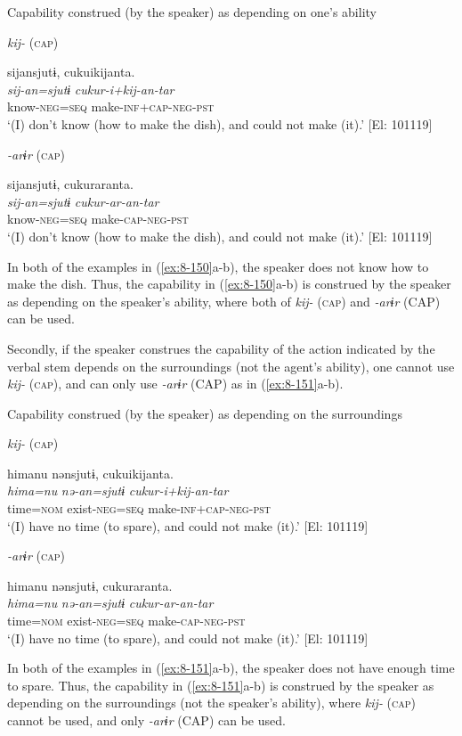\ea\label{ex:8-150}
  Capability construed (by the speaker) as depending on one’s ability

\ea \textit{kij-} (\textsc{cap})

  {\TM}
\glll  sijansjutɨ,  cukuikijanta.\\
\textit{sij-an=sjutɨ}  \textit{cukur-i+kij-an-tar}\\
    know-\textsc{neg}=\textsc{seq}  make-\textsc{inf}+\textsc{cap}-\textsc{neg}-\textsc{pst}\\
\glt ‘(I) don’t know (how to make the dish), and could not make (it).’ [El: 101119]


\ex \textit{-arɨr} (\textsc{cap})

  {\TM}
\glll  sijansjutɨ,  cukuraranta.\\
\textit{sij-an=sjutɨ}  \textit{cukur-ar-an-tar}\\
    know-\textsc{neg}=\textsc{seq}  make-\textsc{cap}-\textsc{neg}-\textsc{pst}\\
\glt ‘(I) don’t know (how to make the dish), and could not make (it).’ [El: 101119]
\z
\z

In both of the examples in (\ref{ex:8-150}a-b), the speaker does not know how to make the dish. Thus, the capability in (\ref{ex:8-150}a-b) is construed by the speaker as depending on the speaker’s ability, where both of \textit{kij-} (\textsc{cap}) and \textit{-arɨr} (CAP) can be used.

Secondly, if the speaker construes the capability of the action indicated by the verbal stem depends on the surroundings (not the agent’s ability), one cannot use \textit{kij-} (\textsc{cap}), and can only use \textit{-arɨr} (CAP) as in (\ref{ex:8-151}a-b).

\ea\label{ex:8-151}
  Capability construed (by the speaker) as depending on the surroundings

\ea \textit{kij-} (\textsc{cap})

  {\TM}
\glll  *himanu  nənsjutɨ,  cukuikijanta.\\
\textit{hima=nu}  \textit{nə-an=sjutɨ}  \textit{cukur-i+kij-an-tar}\\
    time=\textsc{nom}  exist-\textsc{neg}=\textsc{seq}  make-\textsc{inf}+\textsc{cap}-\textsc{neg}-\textsc{pst}\\
‘(I) have no time (to spare), and could not make (it).’ [El: 101119]


\ex \textit{-arɨr} (\textsc{cap})

  {\TM}
\glll  himanu  nənsjutɨ,  cukuraranta.\\
\textit{hima=nu}  \textit{nə-an=sjutɨ}  \textit{cukur-ar-an-tar}\\
    time=\textsc{nom}  exist-\textsc{neg}=\textsc{seq}  make-\textsc{cap}-\textsc{neg}-\textsc{pst}\\
\glt ‘(I) have no time (to spare), and could not make (it).’ [El: 101119]
\z
\z

In both of the examples in (\ref{ex:8-151}a-b), the speaker does not have enough time to spare. Thus, the capability in (\ref{ex:8-151}a-b) is construed by the speaker as depending on the surroundings (not the speaker’s ability), where \textit{kij-} (\textsc{cap}) cannot be used, and only \textit{-arɨr} (CAP) can be used.
